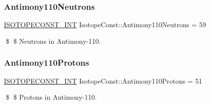 \subsubsection{\texorpdfstring{Antimony110\+Neutrons}{Antimony110Neutrons}}
{\footnotesize\ttfamily \mbox{\hyperlink{group___isotope_const-_macros_ga5f18360b3e99483a35c32d789e62621c}{I\+S\+O\+T\+O\+P\+E\+C\+O\+N\+S\+T\+\_\+\+I\+NT}} Isotope\+Const\+::\+Antimony110\+Neutrons = 59}

\$ \$ Neutrons in Antimony-\/110. \mbox{\label{group___isotope_const-_antimony-_sb110_ga7224fdf4de031ebc3e30d3aebb9e45eb}} 
\subsubsection{\texorpdfstring{Antimony110\+Protons}{Antimony110Protons}}
{\footnotesize\ttfamily \mbox{\hyperlink{group___isotope_const-_macros_ga5f18360b3e99483a35c32d789e62621c}{I\+S\+O\+T\+O\+P\+E\+C\+O\+N\+S\+T\+\_\+\+I\+NT}} Isotope\+Const\+::\+Antimony110\+Protons = 51}

\$ \$ Protons in Antimony-\/110. 